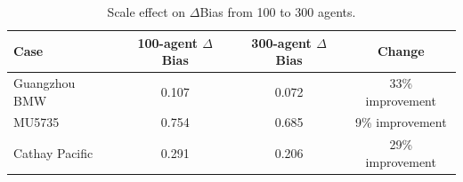 \begin{table}[t]
\centering
\caption{Scale effect on $\Delta$Bias from 100 to 300 agents.}
\label{tab:scale_effect}
\begin{tabular}{lccc}
\toprule
Case & 100-agent $\Delta$Bias & 300-agent $\Delta$Bias & Change \\
\midrule
Guangzhou BMW & 0.107 & 0.072 & 33\% improvement \\
MU5735 & 0.754 & 0.685 & 9\% improvement \\
Cathay Pacific & 0.291 & 0.206 & 29\% improvement \\
\bottomrule
\end{tabular}
\end{table}
